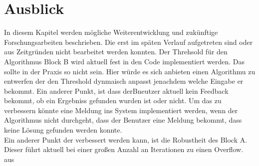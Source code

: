     \newpage
    \chapter{Ausblick}
    In diesem Kapitel werden mögliche Weiterentwicklung und zukünftige Forschungsarbeiten beschrieben. 
    Die erst im späten Verlauf aufgetreten sind oder aus Zeitgründen nicht bearbeitet werden konnten.
    Der Threhsold für den Algorithmus Block B wird aktuell fest in den Code implementiert werden. 
    Das sollte in der Praxis so nicht sein. 
    Hier würde es sich anbieten einen Algorithmu zu entwerfen der den Threshold dynmaisch anpasst jenachdem welche Eingabe er bekommt.
    Ein anderer Punkt, ist dass derBneutzer aktuell kein Feedback bekommt, ob ein Ergebniss gefunden wurden ist oder nicht.
    Um das zu verbessern könnte eine Meldung ins System implementiert werden, wenn der Algorithmus nicht durchgeht, dass der Benutzer eine Meldung bekommt, dass keine Lösung gefunden werden konnte.\\
    Ein anderer Punkt der verbessert werden kann, ist die Robustheit des Block A. 
    Dieser führt aktuell bei einer großen Anzahl an Iterationen zu einen Overflow. 
    aus
    \newpage
    \renewcommand{\refname}{}
